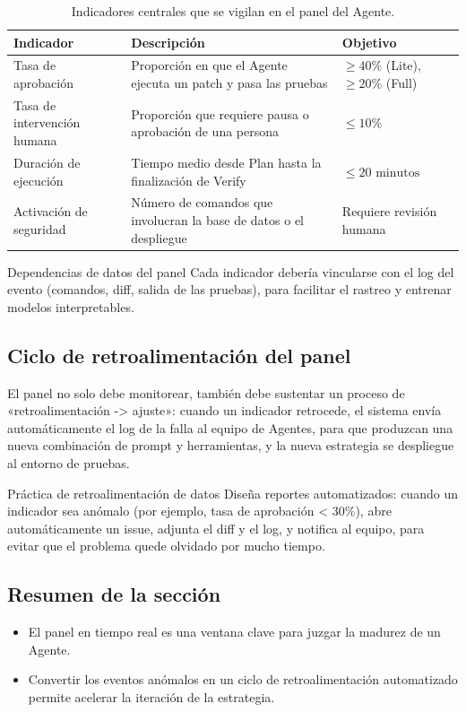 \documentclass[a4paper]{article}
\begin{document}
\begin{table}[H]
\centering
\begin{tabular}{p{} p{} p{}}
\toprule
Indicador & Descripción & Objetivo \\
\midrule
Tasa de aprobación & Proporción en que el Agente ejecuta un patch y pasa las pruebas & \(\geq 40\%\) (Lite), \(\geq 20\%\) (Full) \\
\midrule
Tasa de intervención humana & Proporción que requiere pausa o aprobación de una persona & \(\leq 10\%\) \\
\midrule
Duración de ejecución & Tiempo medio desde Plan hasta la finalización de Verify & \(\leq 20 \text{ minutos}\) \\
\midrule
Activación de seguridad & Número de comandos que involucran la base de datos o el despliegue & Requiere revisión humana \\
\bottomrule
\end{tabular}
\caption{Indicadores centrales que se vigilan en el panel del Agente.}
\end{table}

\begin{knowledgebox}{Dependencias de datos del panel}
Cada indicador debería vincularse con el log del evento (comandos, diff, salida de las pruebas), para facilitar el rastreo y entrenar modelos interpretables.
\end{knowledgebox}

\subsection{Ciclo de retroalimentación del panel}
El panel no solo debe monitorear, también debe sustentar un proceso de «retroalimentación -> ajuste»: cuando un indicador retrocede, el sistema envía automáticamente el log de la falla al equipo de Agentes, para que produzcan una nueva combinación de prompt y herramientas, y la nueva estrategia se despliegue al entorno de pruebas.

\begin{importantbox}{Práctica de retroalimentación de datos}
Diseña reportes automatizados: cuando un indicador sea anómalo (por ejemplo, tasa de aprobación < 30\%), abre automáticamente un issue, adjunta el diff y el log, y notifica al equipo, para evitar que el problema quede olvidado por mucho tiempo.
\end{importantbox}

\subsection{Resumen de la sección}
\begin{itemize}
    \item El panel en tiempo real es una ventana clave para juzgar la madurez de un Agente.
    \item Convertir los eventos anómalos en un ciclo de retroalimentación automatizado permite acelerar la iteración de la estrategia.
\end{itemize}
\end{document}
